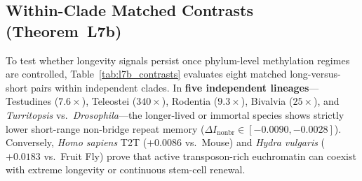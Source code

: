 \documentclass[11pt,a4paper]{article}
\renewcommand{\_}{\origunderscore\penalty200\relax}
\theoremstyle{remark}
\begin{document}
\subsection{Within-Clade Matched Contrasts (Theorem~L7b)}
To test whether longevity signals persist once phylum-level methylation regimes are controlled, Table~\ref{tab:l7b_contrasts} evaluates eight matched long-versus-short pairs within independent clades.
In \textbf{five independent lineages}---Testudines ($7.6\times$), Teleostei ($340\times$), Rodentia ($9.3\times$), Bivalvia ($25\times$), and \textit{Turritopsis} vs.\ \textit{Drosophila}---the longer-lived or immortal species shows strictly lower short-range non-bridge repeat memory ($\Delta I_{\mathrm{nonbr}} \in [-0.0090, -0.0028]$).
Conversely, \textit{Homo sapiens} T2T ($+0.0086$ vs.\ Mouse) and \textit{Hydra vulgaris} ($+0.0183$ vs.\ Fruit Fly) prove that active transposon-rich euchromatin can coexist with extreme longevity or continuous stem-cell renewal.
\end{document}
